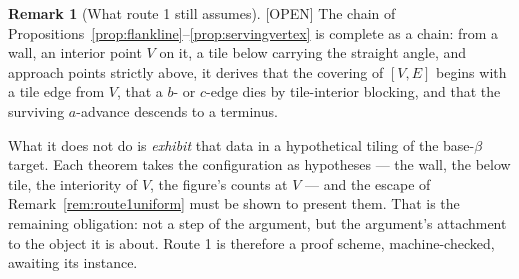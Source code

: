 \documentclass[11pt,reqno]{amsart}
\theoremstyle{plain}
\theoremstyle{definition}
\newtheorem{remark}[theorem]{Remark}
\newcommand{\lab}[1]{\hfill\textnormal{\footnotesize\textsc{[#1]}}}
\begin{document}
\begin{remark}[What route 1 still assumes]\label{rem:routeoneopen}\lab{OPEN}
The chain of Propositions~\ref{prop:flankline}--\ref{prop:servingvertex} is complete as a chain: from
a wall, an interior point $V$ on it, a tile below carrying the straight angle, and approach points
strictly above, it derives that the covering of $[V,E]$ begins with a tile edge from $V$, that a $b$-
or $c$-edge dies by tile-interior blocking, and that the surviving $a$-advance descends to a
terminus.

What it does not do is \emph{exhibit} that data in a hypothetical tiling of the base-$\beta$ target.
Each theorem takes the configuration as hypotheses --- the wall, the below tile, the interiority of
$V$, the figure's counts at $V$ --- and the escape of Remark~\ref{rem:route1uniform} must be shown
to present them. That is the remaining obligation: not a step of the argument, but the argument's
attachment to the object it is about. Route 1 is therefore a proof scheme, machine-checked, awaiting
its instance.
\end{remark}
\end{document}
